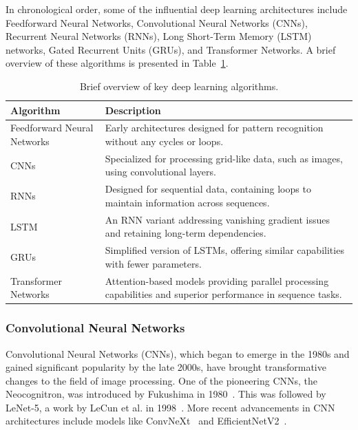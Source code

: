 In chronological order, some of the influential deep learning architectures include Feedforward Neural Networks, Convolutional Neural Networks (CNNs), Recurrent Neural Networks (RNNs), Long Short-Term Memory (LSTM) networks, Gated Recurrent Units (GRUs), and Transformer Networks. A brief overview of these algorithms is presented in Table~\ref{tab:deep_learning_overview}.

\begin{table}[h]
\centering
\begin{tabularx}{\linewidth}{|l|X|}
\hline
\textbf{Algorithm} & \textbf{Description} \\
\hline
Feedforward Neural Networks & Early architectures designed for pattern recognition without any cycles or loops. \\
\hline
CNNs & Specialized for processing grid-like data, such as images, using convolutional layers. \\
\hline
RNNs & Designed for sequential data, containing loops to maintain information across sequences. \\
\hline
LSTM & An RNN variant addressing vanishing gradient issues and retaining long-term dependencies. \\
\hline
GRUs & Simplified version of LSTMs, offering similar capabilities with fewer parameters. \\
\hline
Transformer Networks & Attention-based models providing parallel processing capabilities and superior performance in sequence tasks. \\
\hline
\end{tabularx}
\caption{Brief overview of key deep learning algorithms.}
\label{tab:deep_learning_overview}
\end{table}




\subsubsection*{Convolutional Neural Networks}

Convolutional Neural Networks (CNNs), which began to emerge in the 1980s and gained significant popularity by the late 2000s, have brought transformative changes to the field of image processing. One of the pioneering CNNs, the Neocognitron, was introduced by Fukushima in 1980~\cite{fukushima1980neocognitron}. This was followed by LeNet-5, a work by LeCun et al. in 1998~\cite{lecun1995convolutional}. More recent advancements in CNN architectures include models like ConvNeXt~\cite{liu2022convnet} and EfficientNetV2~\cite{tan2021efficientnetv2}.\\ 


